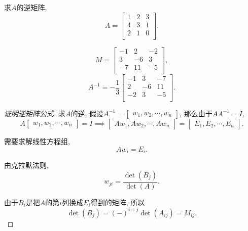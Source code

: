 \begin{example}
    求$A$的逆矩阵, 
    \begin{equation}
      A = \begin{bmatrix}
       1 & 2 & 3\\
       4 & 3 & 1\\
       2 & 1 & 0\\
      \end{bmatrix}.
    \end{equation}

    \begin{equation}
      M = \begin{bmatrix}
       -1 & 2 & -2\\
       3 & -6 & 3\\
       -7 & 11 & -5\\
      \end{bmatrix},
    \end{equation}
    \begin{equation}
      A^{-1} = - \frac{1}{3} \begin{bmatrix}
       -1 & 3 & -7\\
       2 & -6 & 11\\
       -2 & 3 & -5\\
      \end{bmatrix}.
    \end{equation}
\end{example}

\begin{proof}[证明逆矩阵公式]
    求$A$的逆, 假设$A^{-1} = \begin{bmatrix} w_1, w_2, \cdots, w_n \end{bmatrix}$, 那么由于$A A^{-1} = I$,
    \begin{equation}
      A \begin{bmatrix} w_1, w_2, \cdots, w_n \end{bmatrix} = I
      \implies 
      \begin{bmatrix} Aw_1, Aw_2, \cdots, Aw_n \end{bmatrix} = \begin{bmatrix} E_1, E_2, \cdots, E_n \end{bmatrix}.
    \end{equation}
    
    需要求解线性方程组, 
    \begin{equation}
      A w_i = E_i.
    \end{equation}

    由克拉默法则,
    \begin{equation}
      w_{ji} = \frac{\det \left( B_j \right)}{\det \left( A \right)}.
    \end{equation}

    由于$B_i$是把$A$的第$i$列换成$E_i$得到的矩阵, 所以
    \begin{equation}
      \det \left( B_j \right) = \left( - \right) ^{i + j} \det \left( A_{i j} \right) = M_{ij}.
    \end{equation}
\end{proof}